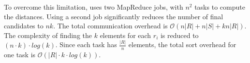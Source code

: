 To overcome this limitation,  {\bf \HBNLJ}  \cite{Zhang:2012:EPK:2247596.2247602} uses two MapReduce jobs, with $n^2$  
tasks 
to compute the distances.
Using a second  job significantly reduces the number of final candidates to $nk$. 
The total communication overhead is $\mathcal{O}(n\left|R\right|+n\left|S\right|+kn\left|R\right|)$. The 
complexity of finding the $k$ elements for each $r_i$ is reduced to $\left(n \cdot k
\right) \cdot log\left(k\right)$. Since each task has $\frac{\left|R\right|}{n}$ elements, the total sort overhead for 
one task is $\mathcal{O}(\left|R\right| \cdot k \cdot log(k))$.



